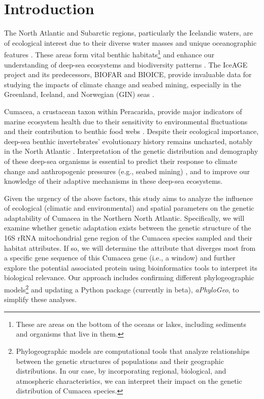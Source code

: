 \section{Introduction}\label{introduction}
The North Atlantic and Subarctic regions, particularly the Icelandic waters, are of ecological interest due to their diverse water masses and unique oceanographic features \citep{schnurr_composition_2014, meisner_benthic_2014, uhlir_adding_2021}. These areas form vital {benthic habitats}\footnote{These are areas on the bottom of the oceans or lakes, including sediments and organisms that live in them.} \citep{levin2009ecological} and enhance our understanding of deep-sea ecosystems and biodiversity patterns \citep{rogers2007corals, danovaro2008exponential, uhlir_adding_2021}. The IceAGE project and its predecessors, BIOFAR and BIOICE, provide invaluable data for studying the impacts of climate change and seabed mining, especially in the Greenland, Iceland, and Norwegian (GIN) seas \citep{meisner_prefacebiodiversity_2018}. 

Cumacea, a crustacean taxon within Peracarida, provide major indicators of marine ecosystem health due to their sensitivity to environmental fluctuations \citep{stransky_diversity_2010} and their contribution to benthic food webs \citep{rehm2009cumacea}. Despite their ecological importance, deep-sea benthic invertebrates’ evolutionary history remains uncharted, notably in the North Atlantic \citep{jennings_phylogeographic_2014}. Interpretation of the genetic distribution and demography of these deep-sea organisms is essential to predict their response to climate change \citep{jennings_phylogeographic_2014} and anthropogenic pressures (e.g., seabed mining) \citep{meisner_prefacebiodiversity_2018}, and to improve our knowledge of their adaptive mechanisms in these deep-sea ecosystems.

Given the urgency of the above factors, this study aims to analyze the influence of ecological (climatic and environmental) and spatial parameters on the genetic adaptability of Cumacea in the Northern North Atlantic. Specifically, we will examine whether genetic adaptation exists between the genetic structure of the 16S rRNA mitochondrial gene region of the Cumacea species sampled and their habitat attributes. If so, we will determine the attribute that diverges most from a specific gene sequence of this Cumacea gene (i.e., a window) and further explore the potential associated protein using bioinformatics tools to interpret its biological relevance. Our approach includes confirming different {phylogeographic models}\footnote{Phylogeographic models are computational tools that analyze relationships between the genetic structures of populations and their geographic distributions. In our case, by incorporating regional, biological, and atmospheric characteristics, we can interpret their impact on the genetic distribution of Cumacea species.} and updating a Python package (currently in beta), \textit{aPhyloGeo}, to simplify these analyses.

